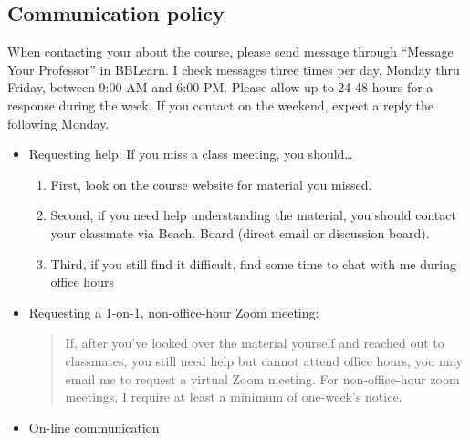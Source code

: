 \documentclass[11pt,]{article}
\providecommand{\tightlist}{%
  \setlength{\itemsep}{0pt}\setlength{\parskip}{0pt}}
\begin{document}
\hypertarget{communication-policy}{%
\subsection{Communication policy}\label{communication-policy}}

When contacting your about the course, please send message through
``Message Your Professor'' in BBLearn. I check messages three times per
day, Monday thru Friday, between 9:00 AM and 6:00 PM. Please allow up to
24-48 hours for a response during the week. If you contact on the
weekend, expect a reply the following Monday.

\begin{itemize}
\item
  Requesting help: If you miss a class meeting, you should\ldots{}

  \begin{enumerate}
  \def\labelenumi{\arabic{enumi}.}
  \tightlist
  \item
    First, look on the course website for material you missed.
  \item
    Second, if you need help understanding the material, you should
    contact your classmate via Beach. Board (direct email or discussion
    board).
  \item
    Third, if you still find it difficult, find some time to chat with
    me during office hours
  \end{enumerate}
\item
  Requesting a 1-on-1, non-office-hour Zoom meeting:

  \begin{quote}
  If, after you've looked over the material yourself and reached out to
  classmates, you still need help but cannot attend office hours, you
  may email me to request a virtual Zoom meeting. For non-office-hour
  zoom meetings, I require at least a minimum of one-week's notice.
  \end{quote}
\item
  On-line communication


\end{itemize}
\end{document}
